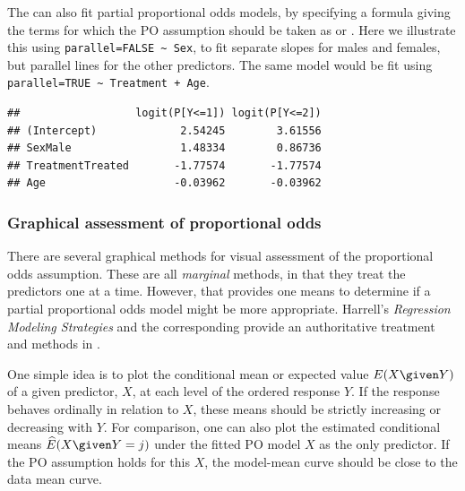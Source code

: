 \documentclass[11pt]{book}
\renewenvironment{knitrout}{\small\renewcommand{\baselinestretch}{.85}}{} %
\begin{document}
The  can also fit partial proportional odds models, by specifying a
formula giving the terms for which the PO assumption should be taken as 
or .  Here we illustrate this using \verb|parallel=FALSE ~ Sex|, to fit
separate slopes for males and females, but parallel lines for the other predictors.
The same model would be fit using \verb|parallel=TRUE ~ Treatment + Age|.
\begin{knitrout}
\color{fgcolor}\begin{kframe}
\begin{alltt}
 \hlkwb{<-}  \hlopt{~}  \hlopt{+}  \hlopt{+}  
   \hlstd{=} \hlstd{(}\hlstd{=} \hlopt{~} 
 \hlstd{=}\hlstd{)}
\end{alltt}
\begin{verbatim}
##                  logit(P[Y<=1]) logit(P[Y<=2])
## (Intercept)             2.54245        3.61556
## SexMale                 1.48334        0.86736
## TreatmentTreated       -1.77574       -1.77574
## Age                    -0.03962       -0.03962
\end{verbatim}
\end{kframe}
\end{knitrout}

\subsubsection{Graphical assessment of proportional odds}

There are several graphical methods for visual assessment of the proportional odds
assumption.  These are all \emph{marginal} methods, in that they treat the predictors
one at a time.  However, that provides one means to determine if a partial
proportional odds model might be more appropriate.
Harrell's \citeyear[Ch. 13-14]{Harrell:2001} \emph{Regression Modeling Strategies}
and the corresponding  provide an authoritative treatment
and methods in \R.

One simple idea is to plot the conditional mean or expected value $E (X \given Y)$
of a given predictor, $X$, at each level of
the ordered response $Y$. If the response behaves ordinally in relation to $X$,
these means should be strictly increasing or decreasing with $Y$.
For comparison, one can also plot the estimated conditional means
$\widehat{E} (X \given Y = j)$ under the fitted PO model $X$ as the only predictor.
If the PO assumption holds for this $X$, the model-mean curve should be close to the
data mean curve.
\end{document}

